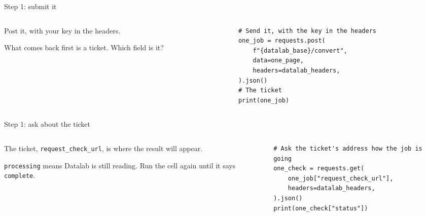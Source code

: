 \documentclass[9pt,aspectratio=169]{beamer}
\begin{document}
\begin{frame}[fragile]{Step 1: submit it}
    \begin{columns}[T]
        \begin{column}{0.37\textwidth}
            Post it, with your key in the headers.

            \medskip
            What comes back first is a ticket. Which field is it?
        \end{column}
        \begin{column}{0.6\textwidth}
\begin{lstlisting}
# Send it, with the key in the headers
one_job = requests.post(
    f"{datalab_base}/convert",
    data=one_page,
    headers=datalab_headers,
).json()
# The ticket
print(one_job)
\end{lstlisting}
        \end{column}
    \end{columns}
\end{frame}

\begin{frame}[fragile]{Step 1: ask about the ticket}
    \begin{columns}[T]
        \begin{column}{0.37\textwidth}
            The ticket, \texttt{request\_check\_url}, is where the result will appear.

            \medskip
            \texttt{processing} means Datalab is still reading. Run the cell again until it says \texttt{complete}.
        \end{column}
        \begin{column}{0.6\textwidth}
\begin{lstlisting}
# Ask the ticket's address how the job is going
one_check = requests.get(
    one_job["request_check_url"],
    headers=datalab_headers,
).json()
print(one_check["status"])
\end{lstlisting}
        \end{column}
    \end{columns}
\end{frame}
\end{document}
